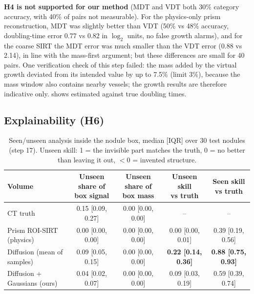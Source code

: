 \textbf{H4 is not supported for our method} (MDT and VDT both 30\% category accuracy, with 40\% of pairs not measurable). For the physics-only prism reconstruction, MDT was slightly better than VDT (50\% vs 48\% accuracy, doubling-time error 0.77 vs 0.82 in $\log_2$ units, no false growth alarms), and for the coarse SIRT the MDT error was much smaller than the VDT error (0.88 vs 2.14), in line with the mass-first argument; but these differences are small for 40 pairs. One verification check of this step failed: the mass added by the virtual growth deviated from its intended value by up to 7.5\% (limit 3\%), because the mass window also contains nearby vessels; the growth results are therefore indicative only.  shows estimated against true doubling times.


\subsection{Explainability (H6)}

\begin{table}[!htbp]
\centering\small
\caption{Seen/unseen analysis inside the nodule box, median [IQR] over 30 test nodules (step 17). Unseen skill: 1 = the invisible part matches the truth, 0 = no better than leaving it out, $<0$ = invented structure.}
\label{tab:explain}
\begin{adjustbox}{max width=\linewidth}
\begin{tabular}{l cccc}
\toprule
Volume & \makecell{Unseen share of\\box signal} & \makecell{Unseen share of\\box mass} & \makecell{Unseen skill\\vs truth} & \makecell{Seen skill\\vs truth} \\
\midrule
CT truth & 0.15 [0.09, 0.27] & 0.00 [0.00, 0.00] & -- & -- \\
Prism ROI-SIRT (physics) & 0.00 [0.00, 0.00] & 0.00 [0.00, 0.00] & 0.00 [0.00, 0.01] & 0.39 [0.19, 0.56] \\
Diffusion (mean of samples) & 0.09 [0.05, 0.15] & 0.00 [0.00, 0.00] & \textbf{0.22 [0.14, 0.36]} & \textbf{0.88 [0.75, 0.93]} \\
Diffusion + Gaussians (ours) & 0.04 [0.02, 0.07] & 0.00 [0.00, 0.00] & 0.09 [0.03, 0.19] & 0.59 [0.39, 0.74] \\
\bottomrule
\end{tabular}
\end{adjustbox}
\end{table}

